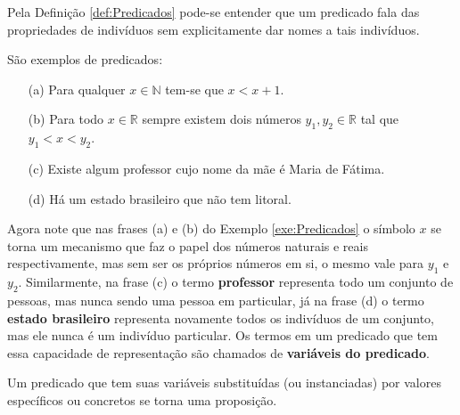 Pela Definição \ref{def:Predicados} pode-se entender que um predicado fala das propriedades de indivíduos sem explicitamente dar nomes a tais indivíduos.

\begin{exemplo}\label{exe:Predicados}
	São exemplos de predicados:
	\begin{itemize}
		\item[(a)] Para qualquer $x \in \mathbb{N}$ tem-se que $x < x + 1$.
		\item[(b)] Para todo $x \in \mathbb{R}$ sempre existem dois números $y_1, y_2 \in \mathbb{R}$ tal que $y_1 < x < y_2$.
		\item[(c)] Existe algum professor cujo nome da mãe é Maria de Fátima.
		\item[(d)] Há um estado brasileiro que não tem litoral.
	\end{itemize}
\end{exemplo}

Agora note que nas frases (a) e (b) do Exemplo \ref{exe:Predicados} o símbolo $x$ se torna um mecanismo que faz o papel dos números naturais e reais respectivamente, mas sem ser os próprios números em si, o mesmo vale para $y_1$ e $y_2$. Similarmente, na frase (c) o termo \textbf{professor} representa todo um conjunto de pessoas, mas nunca sendo uma pessoa em particular, já na frase (d) o termo \textbf{estado brasileiro} representa novamente todos os indivíduos de um conjunto, mas ele nunca é um indivíduo particular. Os termos em um predicado que tem essa capacidade de representação são chamados de \textbf{variáveis do predicado}.

\begin{atencao}
	Um predicado que tem suas variáveis substituídas (ou instanciadas) por valores específicos ou concretos se torna uma proposição.
\end{atencao}




